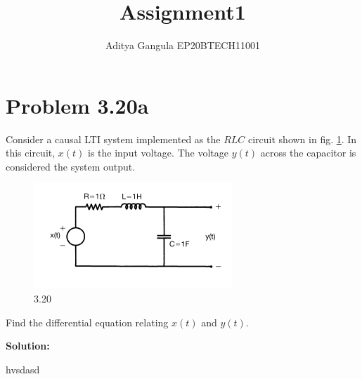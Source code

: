 \documentclass{article}
\title{Assignment1}
\author{Aditya Gangula EP20BTECH11001}
\begin{document}
\maketitle

\section*{Problem 3.20a}
Consider a causal LTI system implemented as the $RLC$ circuit shown in fig. \ref{prob}. In this circuit, $x(t)$ is the input voltage. The voltage $y(t)$ across the capacitor is considered the system output.
\begin{figure}[ht]
    \centering
    \includegraphics{probimg.png}
    \caption{3.20}
    \label{prob}
\end{figure}

\raggedright Find the differential equation relating $x(t)$ and $y(t)$.

\textbf {Solution:}

hvsdasd
\end{document}
